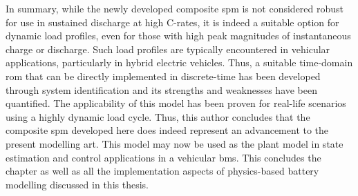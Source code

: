 In  summary, while  the newly  developed composite  \gls{spm} is  not considered
robust for use in  sustained discharge at high C-rates, it  is indeed a suitable
option for  dynamic load profiles, even  for those with high  peak magnitudes of
instantaneous charge or discharge. Such  load profiles are typically encountered
in vehicular  applications, particularly  in hybrid  electric vehicles.  Thus, a
suitable time-domain \gls{rom} that can be directly implemented in discrete-time
has  been  developed  through  system   identification  and  its  strengths  and
weaknesses have been quantified. The applicability of this model has been proven
for real-life  scenarios using a  highly dynamic  load cycle. Thus,  this author
concludes that the  composite \gls{spm} developed here does  indeed represent an
advancement to  the present  modelling art. This  model may now  be used  as the
plant  model  in  state  estimation  and control  applications  in  a  vehicular
\gls{bms}. This concludes the chapter as  well as all the implementation aspects
of physics-based battery modelling discussed in this thesis.
\addlines



